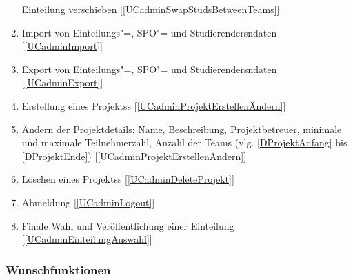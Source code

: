 \documentclass[parskip=full]{scrartcl}
\newcommand{\swtLabel}[1]{\textbf{/#1\arabic*0/}}
\newcommand{\testRef}[1]{[\ref{#1}]}
\begin{document}
\begin{enumerate}[label=\swtLabel{FA}, resume]
  \gls{Einteilung} verschieben  \label{FAadminMoveStudsBetweenTeams} \testRef{UCadminSwapStudsBetweenTeams}
  \item Import von \gls{Einteilung}s"=, \gls{SPO}"= und \glspl{Studierender}ndaten \label{FAimport} \testRef{UCadminImport}
  \item Export von \gls{Einteilung}s"=, \gls{SPO}"= und \glspl{Studierender}ndaten \label{FAexport}\testRef{UCadminExport}
  \item Erstellung eines \glspl{Projekt}s \label{FAadminCreateProjekt}
  \testRef{UCadminProjektErstellenÄndern}
  \item Ändern der \gls{Projektdetails}: Name, Beschreibung, \gls{Projektbetreuer}, %
        minimale und maximale Teilnehmerzahl, Anzahl der \glspl{Team} (vlg.
        \ref{DProjektAnfang} bis \ref{DProjektEnde})
        \label{FAadminProjektänderung} \testRef{UCadminProjektErstellenÄndern}
  \item Löschen eines \glspl{Projekt}s \label{FAadminDeleteProjekt}
  \testRef{UCadminDeleteProjekt}
  \item Abmeldung \label{FAadminAbmeldung} \testRef{UCadminLogout}
  \item Finale Wahl und Veröffentlichung einer \gls{Einteilung} \label{FAadminAuswahl}
  \testRef{UCadminEinteilungAuswahl}
\end{enumerate}

\subsubsection{Wunschfunktionen}
\end{document}

